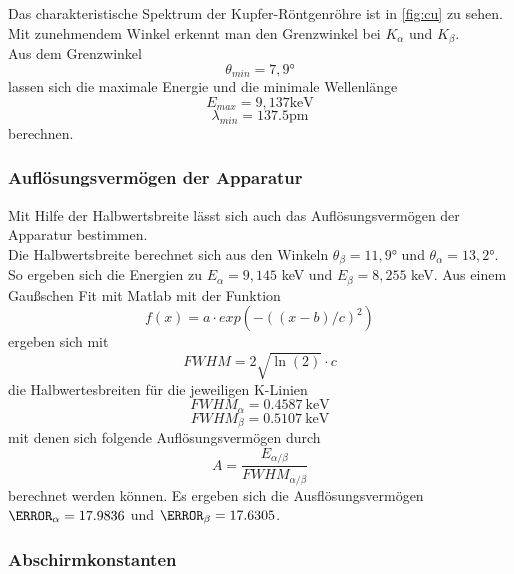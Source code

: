 \documentclass[a4paper]{scrartcl}
\begin{document}
Das charakteristische Spektrum der Kupfer-Röntgenröhre ist in \autoref{fig:cu} zu sehen.\\
Mit zunehmendem Winkel erkennt man den Grenzwinkel bei  $K_{\alpha}$ und $K_{\beta}$. \\ 
Aus dem Grenzwinkel 
\begin{equation*}
  \theta_{min} = 7,9°
\end{equation*}
lassen sich die maximale Energie und die minimale Wellenlänge 
\begin{equation*}
  E_{max} = 9,137 \mathrm{keV}
\end{equation*}
\begin{equation*}
  \lambda_{min} = 137.5 \si{\pico\m}
\end{equation*} 
berechnen.


\subsubsection*{Auflösungsvermögen der Apparatur}

Mit Hilfe der Halbwertsbreite lässt sich auch das Auflösungsvermögen der Apparatur bestimmen. \\
Die Halbwertsbreite berechnet sich aus den Winkeln $\theta_\beta = 11,9°$ und $\theta_\alpha = 13,2°$.\\
So ergeben sich die Energien zu $E_\alpha = 9,145$ keV und $E_\beta = 8,255$ keV. Aus einem Gaußschen Fit mit Matlab mit der Funktion
\begin{equation*}
  f(x)=a\cdot exp(-((x-b)/c)^2)
\end{equation*} 
ergeben sich mit
\begin{equation*}
  FWHM=2\sqrt{\ln(2)}\cdot c
\end{equation*} 
die Halbwertesbreiten für die jeweiligen K-Linien
\begin{equation*}
  FWHM_{\alpha}=0.4587\ \si{\keV}
\end{equation*}
\begin{equation*}
  FWHM_{\beta}=0.5107\ \si{\keV}
\end{equation*} 
mit denen sich folgende Auflösungsvermögen durch
\begin{equation*}
  A=\frac{E_{\alpha/\beta}}{FWHM_{\alpha/\beta}}
\end{equation*}
berechnet werden können.
Es ergeben sich die Ausflösungsvermögen $\A_{\alpha}=17.9836$ und $\A_{\beta}=17.6305$.\\


\subsubsection*{Abschirmkonstanten}
\end{document}
